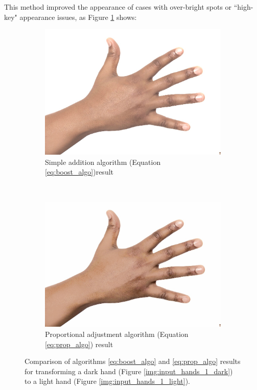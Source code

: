 This method improved the appearance of cases with over-bright spots or ``high-key" appearance issues, as Figure \ref{img:compare_bright_spot} shows:
\begin{figure}[H]
    \centering
    \begin{subfigure}[b]{0.40\textwidth}
        \includegraphics[width=\textwidth]{../rc_test/outputs/20170516_boost_test/hand_dark_to_hand_light.jpg}
        \caption{Simple addition algorithm (Equation \ref{eq:boost_algo})result}
    \end{subfigure}
    ~
    \begin{subfigure}[b]{0.40\textwidth}
        \includegraphics[width=\textwidth]{../rc_test/outputs/20170516_proportional_test/hand_dark_to_hand_light.jpg}
        \caption{Proportional adjustment algorithm (Equation \ref{eq:prop_algo}) result}
    \end{subfigure}
    \caption{Comparison of algorithms \ref{eq:boost_algo} and \ref{eq:prop_algo} results for transforming a dark hand (Figure \ref{img:input_hands_1_dark}) to a light hand (Figure \ref{img:input_hands_1_light}).\label{img:compare_bright_spot}}
\end{figure}

